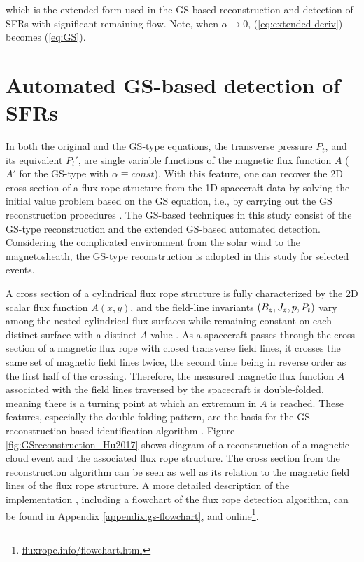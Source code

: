 which is the extended form used in the GS-based reconstruction and detection of SFRs with significant remaining flow. Note, when $\alpha\rightarrow 0$, (\ref{eq:extended-deriv}) becomes (\ref{eq:GS}).

\section{Automated GS-based detection of SFRs}\label{sec:GS-detection}
In both the original and the GS-type equations, the transverse pressure $P_t$, and its equivalent $P_t'$, are single variable functions of the magnetic flux function $A$ ($A'$ for the GS-type with $\alpha\equiv const$). With this feature, one can recover the 2D cross-section of a flux rope structure from the 1D spacecraft data by solving the initial value problem based on the GS equation, i.e., by carrying out the GS reconstruction procedures \citep{Hau:1999, HuSonnerup:2002, Hu:2017}. The GS-based techniques in this study consist of the GS-type reconstruction and the extended GS-based automated detection. Considering the complicated environment from the solar wind to the magnetosheath, the GS-type reconstruction is adopted in this study for selected events.

A cross section of a cylindrical flux rope structure is fully characterized by the 2D scalar flux function $A(x, y)$, and the field-line invariants $\left( B_z,J_z,p, P_t \right)$ vary among the nested cylindrical flux surfaces while remaining constant on each distinct surface with a distinct $A$ value \citep{Hu:2018}. As a spacecraft passes through the cross section of a magnetic flux rope with closed transverse field lines, it crosses the same set of magnetic field lines twice, the second time being in reverse order as the first half of the crossing. Therefore, the measured magnetic flux function $A$ associated with the field lines traversed by the spacecraft is double-folded, meaning there is a turning point at which an extremum in $A$ is reached. These features, especially the double-folding pattern, are the basis for the GS reconstruction-based identification algorithm \citep{Hu:2018}. Figure \ref{fig:GSreconstruction_Hu2017} shows diagram of a reconstruction of a magnetic cloud event and the associated flux rope structure. The cross section from the reconstruction algorithm can be seen as well as its relation to the magnetic field lines of the flux rope structure. A more detailed description of the implementation \citep{Hu:2018}, including a flowchart of the flux rope detection algorithm, can be found in Appendix \ref{appendix:gs-flowchart}, and online\footnote{\url{fluxrope.info/flowchart.html}}.

